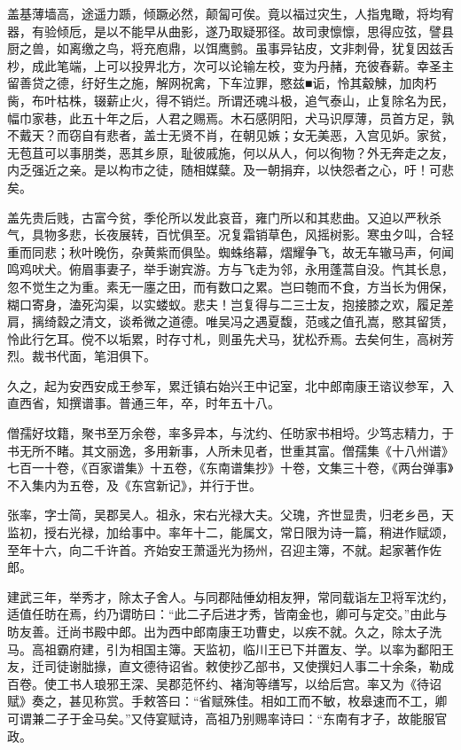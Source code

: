 \documentclass[12pt,UTF8]{ctexbook}
\begin{document}
盖基薄墙高，途遥力踬，倾蹶必然，颠匐可俟。竟以福过灾生，人指鬼瞰，将均宥器，有验倾卮，是以不能早从曲影，遂乃取疑邪径。故司隶懔懔，思得应弦，譬县厨之兽，如离缴之鸟，将充庖鼎，以饵鹰鹯。虽事异钻皮，文非刺骨，犹复因兹舌杪，成此笔端，上可以投畀北方，次可以论输左校，变为丹赭，充彼舂薪。幸圣主留善贷之德，纡好生之施，解网祝禽，下车泣罪，愍兹■诟，怜其觳觫，加肉朽胔，布叶枯株，辍薪止火，得不销烂。所谓还魂斗极，追气泰山，止复除名为民，幅巾家巷，此五十年之后，人君之赐焉。木石感阴阳，犬马识厚薄，员首方足，孰不戴天？而窃自有悲者，盖士无贤不肖，在朝见嫉；女无美恶，入宫见妒。家贫，无苞苴可以事朋类，恶其乡原，耻彼戚施，何以从人，何以徇物？外无奔走之友，内乏强近之亲。是以构市之徒，随相媒糵。及一朝捐弃，以快怨者之心，吁！可悲矣。

盖先贵后贱，古富今贫，季伦所以发此哀音，雍门所以和其悲曲。又迫以严秋杀气，具物多悲，长夜展转，百忧俱至。况复霜销草色，风摇树影。寒虫夕叫，合轻重而同悲；秋叶晚伤，杂黄紫而俱坠。蜘蛛络幕，熠耀争飞，故无车辙马声，何闻鸣鸡吠犬。俯眉事妻子，举手谢宾游。方与飞走为邻，永用蓬蒿自没。忾其长息，忽不觉生之为重。素无一廛之田，而有数口之累。岂曰匏而不食，方当长为佣保，糊口寄身，溘死沟渠，以实蝼蚁。悲夫！岂复得与二三士友，抱接膝之欢，履足差肩，摛绮縠之清文，谈希微之道德。唯吴冯之遇夏馥，范彧之值孔嵩，愍其留赁，怜此行乞耳。傥不以垢累，时存寸札，则虽先犬马，犹松乔焉。去矣何生，高树芳烈。裁书代面，笔泪俱下。

久之，起为安西安成王参军，累迁镇右始兴王中记室，北中郎南康王谘议参军，入直西省，知撰谱事。普通三年，卒，时年五十八。

僧孺好坟籍，聚书至万余卷，率多异本，与沈约、任昉家书相埒。少笃志精力，于书无所不睹。其文丽逸，多用新事，人所未见者，世重其富。僧孺集《十八州谱》七百一十卷，《百家谱集》十五卷，《东南谱集抄》十卷，文集三十卷，《两台弹事》不入集内为五卷，及《东宫新记》，并行于世。

张率，字士简，吴郡吴人。祖永，宋右光禄大夫。父瑰，齐世显贵，归老乡邑，天监初，授右光禄，加给事中。率年十二，能属文，常日限为诗一篇，稍进作赋颂，至年十六，向二千许首。齐始安王萧遥光为扬州，召迎主簿，不就。起家著作佐郎。

建武三年，举秀才，除太子舍人。与同郡陆倕幼相友狎，常同载诣左卫将军沈约，适值任昉在焉，约乃谓昉曰：“此二子后进才秀，皆南金也，卿可与定交。”由此与昉友善。迁尚书殿中郎。出为西中郎南康王功曹史，以疾不就。久之，除太子洗马。高祖霸府建，引为相国主簿。天监初，临川王已下并置友、学。以率为鄱阳王友，迁司徒谢朏掾，直文德待诏省。敕使抄乙部书，又使撰妇人事二十余条，勒成百卷。使工书人琅邪王深、吴郡范怀约、褚洵等缮写，以给后宫。率又为《待诏赋》奏之，甚见称赏。手敕答曰：“省赋殊佳。相如工而不敏，枚皋速而不工，卿可谓兼二子于金马矣。”又侍宴赋诗，高祖乃别赐率诗曰：“东南有才子，故能服官政。
\end{document}
